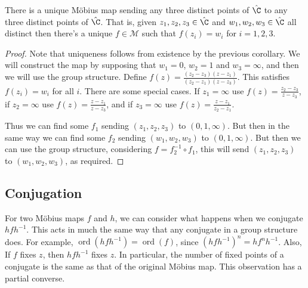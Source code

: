 \documentclass[a4paper]{scrartcl}
\newcommand{\newsection}{\subsection}
\begin{document}
\begin{theorem}
	There is a unique Möbius map sending any three distinct points of $\hat{\C}$ to any three distinct points of $\hat{\C}$. That is, given $z_1, z_2, z_3 \in \hat{\C}$ and $w_1, w_2, w_3 \in \hat{\C}$ all distinct then there's a unique $f \in \mathcal{M}$ such that $f(z_i) = w_i$ for $i = 1, 2, 3$. 
\end{theorem}
\begin{proof}
	Note that uniqueness follows from existence by the previous corollary. We will construct the map by supposing that $w_1 = 0$, $w_2 = 1$ and $w_3 = \infty$, and then we will use the group structure.
	Define $f(z) = \frac{(z_2 - z_3)(z - z_1)}{(z_2 - z_1)(z - z_3)}$. This satisfies $f(z_i) = w_i$ for all $i$. There are some special cases. If $z_1 = \infty$ use $f(z) = \frac{z_2 - z_3}{z - z_3}$, if $z_2 = \infty$ use $f(z) = \frac{z - z_1}{z - z_3}$, and if $z_3 = \infty$ use $f(z) = \frac{z - z_1}{z_2 - z_1}$.

	Thus we can find some $f_1$ sending $(z_1, z_2, z_3)$ to $(0, 1, \infty)$. But then in the same way we can find some $f_2$ sending $(w_1, w_2, w_3)$ to $(0, 1, \infty)$. But then we can use the group structure, considering $f = f_2^{-1} \circ f_1$, this will send $(z_1, z_2, z_3)$ to $(w_1, w_2, w_3)$, as required.
\end{proof}

\newsection{Conjugation}

For two Möbius maps $f$ and $h$, we can consider what happens when we conjugate $h fh^{-1}$. This acts in much the same way that any conjugate in a group structure does. For example, $\operatorname{ord}(hfh^{-1}) = \operatorname{ord}(f)$, since $(hfh^{-1})^{n} = hf^{n} h^{-1}$. Also, If $f$ fixes $z$, then $h fh^{-1}$ fixes $z$. In particular, the number of fixed points of a conjugate is the same as that of the original Möbius map. This observation has a partial converse.
\end{document}
